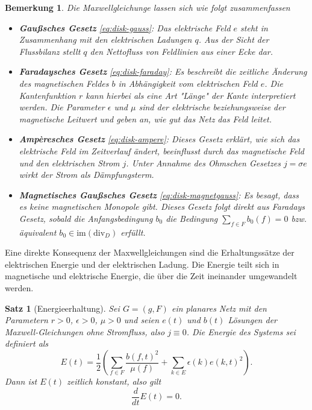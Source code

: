 \documentclass[11pt,a4paper,leqno]{report}
\newtheorem{proposition}{Satz}[chapter]
\newtheorem{remark}[theorem]{Bemerkung}
\numberwithin{equation}{chapter}
\begin{document}
\begin{remark} Die Maxwellgleichunge lassen sich wie folgt zusammenfassen
	\begin{itemize}
		\item \textbf{Gaußsches Gesetz} \eqref{eq:disk-gauss}: Das elektrische Feld \( e \) steht in Zusammenhang mit den elektrischen Ladungen \( q \). Aus der Sicht der Flussbilanz stellt \( q \) den Nettofluss von Feldlinien aus einer Ecke dar.
		
		\item \textbf{Faradaysches Gesetz} \eqref{eq:disk-faraday}: Es beschreibt die zeitliche Änderung des magnetischen Feldes \( b \) in Abhängigkeit vom elektrischen Feld \( e \). Die Kantenfunktion \( r \) kann hierbei als eine Art "Länge" der Kante interpretiert werden. Die Parameter \( \epsilon \) und \( \mu \) sind der elektrische beziehungsweise der magnetische Leitwert und geben an, wie gut das Netz das Feld leitet.
		
		\item \textbf{Ampèresches Gesetz} \eqref{eq:disk-ampere}: Dieses Gesetz erklärt, wie sich das elektrische Feld im Zeitverlauf ändert, beeinflusst durch das magnetische Feld und den elektrischen Strom \( j \). Unter Annahme des Ohmschen Gesetzes \( j = \sigma e \) wirkt der Strom als Dämpfungsterm.
		
		\item \textbf{Magnetisches Gaußsches Gesetz} \eqref{eq:disk-magnetgauss}: Es besagt, dass es keine magnetischen Monopole gibt. Dieses Gesetz folgt direkt aus Faradays Gesetz, sobald die Anfangsbedingung \( b_0 \) die Bedingung \( \sum_{f \in F} b_0(f) = 0 \) bzw. äquivalent \( b_0 \in \mathrm{im}(\mathrm{div}_D) \) erfüllt.
	\end{itemize}
\end{remark}
\noindent
Eine direkte Konsequenz der Maxwellgleichungen sind die Erhaltungssätze der elektrischen Energie und der elektrischen Ladung. Die Energie teilt sich in magnetische und elektrische Energie, die über die Zeit ineinander umgewandelt werden.
\begin{proposition}[Energieerhaltung]
	Sei $G=(g,F)$ ein planares Netz mit den Parametern $r>0$, $\epsilon>0$, $\mu>0$  
	und seien $e(t)$ und $b(t)$ Lösungen der Maxwell-Gleichungen ohne Stromfluss, also $j \equiv 0$.  
	Die Energie des Systems sei definiert als
	\[
	E(t) = \frac{1}{2} \left(\sum_{f \in F} \frac{b(f,t)^2}{\mu(f)} + \sum_{k \in E} \epsilon(k) e(k,t)^2 \right).
	\]
	Dann ist $E(t)$ zeitlich konstant, also gilt
	\[
	\frac{d}{dt} E(t) = 0.
	\]
\end{proposition}
\end{document}
